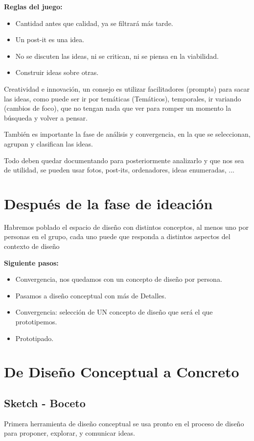 \documentclass[12pt]{report} %
\begin{document}
\textbf{Reglas del juego:}
\begin{itemize}
  \item Cantidad antes que calidad, ya se filtrará más tarde.
  \item Un post-it es una idea.
  \item No se discuten las ideas, ni se critican, ni se piensa en la viabilidad.
  \item Construir ideas sobre otras.
\end{itemize}

Creatividad e innovación, un consejo es utilizar facilitadores (prompts) para sacar las ideas, como puede ser ir por temáticas (Temáticos), temporales, ir variando (cambios de foco), que no tengan nada que ver para romper un momento la búsqueda y volver a pensar.

También es importante la fase de análisis y convergencia, en la que se seleccionan, agrupan y clasifican las ideas.

Todo deben quedar documentando para posteriormente analizarlo y que nos sea de utilidad, se pueden usar fotos, post-its, ordenadores, ideas enumeradas, ...

\section{Después de la fase de ideación}

Habremos poblado el espacio de diseño con distintos conceptos, al menos uno por personas en el grupo, cada uno puede que responda a distintos aspectos del contexto de diseño

\textbf{Siguiente pasos:}
\begin{itemize}
  \item Convergencia, nos quedamos con un concepto de diseño por persona.
  \item Pasamos a diseño conceptual con más de Detalles.
  \item Convergencia: selección de UN concepto de diseño que será el que prototipemos.
  \item Prototipado.
\end{itemize}

\section{De Diseño Conceptual a Concreto}
\subsection{Sketch - Boceto}
Primera herramienta de diseño conceptual se usa pronto en el proceso de diseño para proponer, explorar, y comunicar ideas.
\end{document}

